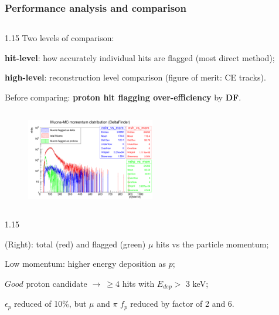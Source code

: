 \documentclass{beamer}
\begin{document}
\begin{frame}
\frametitle{Performance analysis and comparison}
  \begin{columns}
        \begin{column}{1.15\framewidth}
       {\footnotesize Two levels of comparison:}
    \setlength{\leftmargini}{1.2em}
    \begin{itemize}
      {\footnotesize  \item \textbf{hit-level}: how accurately individual hits are flagged (most direct method);
    \item \textbf{high-level}: reconstruction level comparison (figure of merit: CE tracks).
    \vspace{-1mm}
\item Before comparing: \textbf{proton hit flagging over-efficiency} by \textbf{DF}.}
    \end{itemize}
    \end{column}
    \end{columns}
        \vspace{-1mm}
       
        \begin{figure}[!h]
            \centering
            \includegraphics[width =0.5\textwidth]{figures/png/Screenshot_20240805_222923.png}
           \label{fig:0pbarbefore}
        \end{figure}
        
 
    \vspace{-3mm}
    \begin{columns}
        \begin{column}{1.15\framewidth}
    \setlength{\leftmargini}{1.2em}
    \begin{itemize}
      {\footnotesize  
\item (Right): total (red) and flagged (green) $\mu$ hits vs the particle momentum;
\vspace{1mm}
\item Low momentum: higher energy deposition as $p$;
\vspace{1mm}
\item $Good$ proton candidate $\rightarrow \ \geq 4$
hits with $E_{dep} >$ 3 keV; 
\item $\epsilon_p$ reduced of 10\%, but $\mu$ and $\pi$ $f_p$ reduced by factor of 2 and 6.
}
      \end{itemize}
      \end{column}
      \end{columns}
\end{frame}
\end{document}
